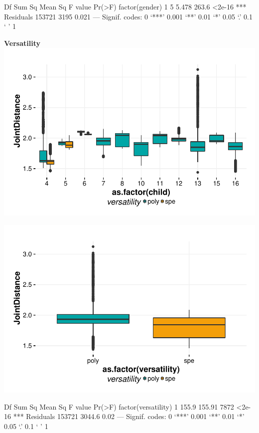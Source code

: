 \documentclass{article}
\begin{document}
\begin{Schunk}
\begin{Soutput}
                   Df Sum Sq Mean Sq F value Pr(>F)    
factor(gender)      1      5   5.478   263.6 <2e-16 ***
Residuals      153721   3195   0.021                   
---
Signif. codes:  0 ‘***’ 0.001 ‘**’ 0.01 ‘*’ 0.05 ‘.’ 0.1 ‘ ’ 1
\end{Soutput}
\end{Schunk}


\textbf{Versatility}
\includegraphics{features-plot_distance_child_versatility_quiz}

\includegraphics{features-plot_distance_gender_quiz}

\begin{Schunk}
\begin{Soutput}
                        Df Sum Sq Mean Sq F value Pr(>F)    
factor(versatility)      1  155.9  155.91    7872 <2e-16 ***
Residuals           153721 3044.6    0.02                   
---
Signif. codes:  0 ‘***’ 0.001 ‘**’ 0.01 ‘*’ 0.05 ‘.’ 0.1 ‘ ’ 1
\end{Soutput}
\end{Schunk}
\end{document}

